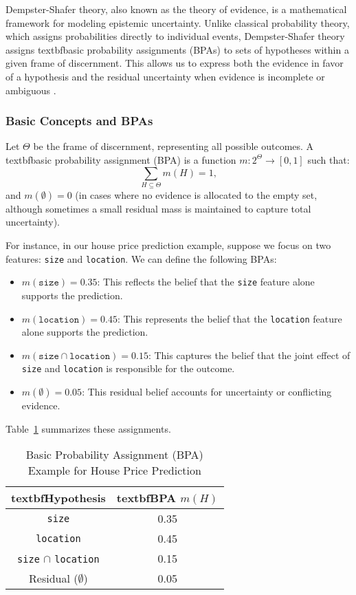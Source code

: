 \documentclass[acmlarge]{acmart}
\begin{document}
Dempster-Shafer theory, also known as the theory of evidence, is a mathematical framework for modeling epistemic uncertainty. Unlike classical probability theory, which assigns probabilities directly to individual events, Dempster-Shafer theory assigns textbf{basic probability assignments (BPAs)} to sets of hypotheses within a given frame of discernment. This allows us to express both the evidence in favor of a hypothesis and the residual uncertainty when evidence is incomplete or ambiguous \cite{shafer1976mathematical}.

\subsubsection{Basic Concepts and BPAs}

Let \(\Theta\) be the frame of discernment, representing all possible outcomes. A textbf{basic probability assignment (BPA)} is a function \( m: 2^{\Theta} \rightarrow [0,1] \) such that:
\[
\sum_{H \subseteq \Theta} m(H) = 1,
\]
and \( m(\emptyset) = 0 \) (in cases where no evidence is allocated to the empty set, although sometimes a small residual mass is maintained to capture total uncertainty).

For instance, in our house price prediction example, suppose we focus on two features: \texttt{size} and \texttt{location}. We can define the following BPAs:
\begin{itemize}
    \item \( m(\texttt{size}) = 0.35 \): This reflects the belief that the \texttt{size} feature alone supports the prediction.
    \item \( m(\texttt{location}) = 0.45 \): This represents the belief that the \texttt{location} feature alone supports the prediction.
    \item \( m(\texttt{size} \cap \texttt{location}) = 0.15 \): This captures the belief that the joint effect of \texttt{size} and \texttt{location} is responsible for the outcome.
    \item \( m(\emptyset) = 0.05 \): This residual belief accounts for uncertainty or conflicting evidence.
\end{itemize}

Table~\ref{tab:bpa_example} summarizes these assignments.

\begin{table}[H]
    \caption{Basic Probability Assignment (BPA) Example for House Price Prediction}
    \label{tab:bpa_example}
    \centering
    \begin{tabular}{|c|c|}
        \hline
        textbf{Hypothesis} & textbf{BPA \( m(H) \)} \\
        \hline
        \texttt{size} & 0.35 \\
        \hline
        \texttt{location} & 0.45 \\
        \hline
        \texttt{size} \(\cap\) \texttt{location} & 0.15 \\
        \hline
        Residual (\( \emptyset \)) & 0.05 \\
        \hline
    \end{tabular}
\end{table}
\end{document}
